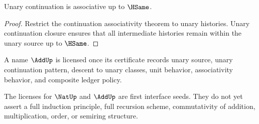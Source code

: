 \begin{theorem}
\label{thm:addition-like-associativity}
Unary continuation is associative up to \(\HSame\).
\end{theorem}
\begin{proof}
Restrict the continuation associativity theorem to unary histories. Unary continuation closure ensures that all intermediate histories remain within the unary source up to \(\HSame\).
\end{proof}

\begin{corollary}
\label{cor:addup-license-proof-standing}
A name \(\AddUp\) is licensed once its certificate records unary source, unary continuation pattern, descent to unary classes, unit behavior, associativity behavior, and composite ledger policy.
\end{corollary}

\begin{remark}
The licenses for \(\NatUp\) and \(\AddUp\) are first interface seeds. They do not yet assert a full induction principle, full recursion scheme, commutativity of addition, multiplication, order, or semiring structure.
\end{remark}
